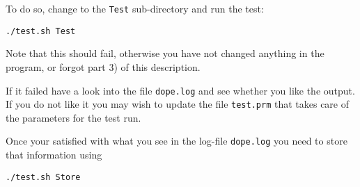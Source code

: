 \begin{enumerate}
  To do so, change to the \texttt{Test} sub-directory and run the test:
\begin{verbatim}
./test.sh Test
\end{verbatim}
  Note that this should fail, otherwise you have not changed anything in the program, 
  or forgot part 3) of this description.
  
  If it failed have a look into the file \texttt{dope.log} and see whether you like the 
  output. If you do not like it you may wish to update the file \texttt{test.prm} that 
  takes care of the parameters for the test run.
  
  Once your satisfied with what you see in the log-file \texttt{dope.log} you need to store 
  that information using
\begin{verbatim}
./test.sh Store
\end{verbatim}
\end{enumerate}


